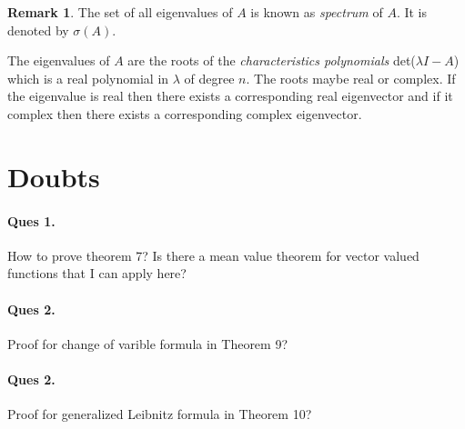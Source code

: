 \documentclass[12pt,reqno]{amsart}
\theoremstyle{plain}
\theoremstyle{definition}
\newtheorem{rem}{Remark}
\begin{document}
\begin{rem}
    The set of all eigenvalues of $A$ is known as {\it spectrum} of $A$. It is denoted by $\sigma(A)$.
\end{rem}
The eigenvalues of $A$ are the roots of the {\it characteristics polynomials} det($\lambda I - A$) which is a real polynomial in $\lambda$ of degree $n$. The roots maybe real or complex. If the eigenvalue is real then there exists a corresponding real eigenvector and if it complex then there exists a corresponding complex eigenvector.





\section{Doubts}
\paragraph{\bf Ques 1.} How to prove theorem 7? Is there a mean value theorem for vector valued functions that I can apply here?
\paragraph{\bf Ques 2.} Proof for change of varible formula in Theorem 9?
\paragraph{\bf Ques 2.} Proof for generalized Leibnitz formula in Theorem 10?
\end{document}
